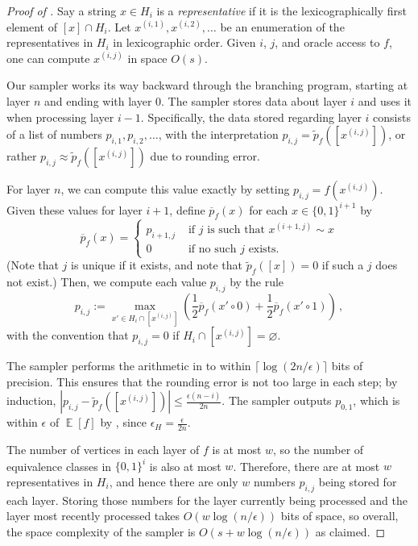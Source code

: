 \documentclass{toc}
\DeclareMathOperator*{\ExpVal}{\mathbb{E}}
\begin{document}
\begin{proof}[Proof of ]
Say a string $x \in H_i$ is a \emph{representative} if it is the lexicographically first element of $[x] \cap H_i$. Let $x^{(i, 1)}, x^{(i, 2)}, \dots$ be an enumeration of the representatives in $H_i$ in lexicographic order. Given $i$, $j$, and oracle access to $f$, one can compute $x^{(i, j)}$ in space $O(s)$.

Our sampler works its way backward through the branching program, starting at layer $n$ and ending with layer $0$. The sampler stores data about layer $i$ and uses it when processing layer $i - 1$. Specifically, the data stored regarding layer $i$ consists of a list of numbers $p_{i, 1}, p_{i, 2}, \dots$, with the interpretation $p_{i, j} = \widetilde{p}_f([x^{(i, j)}])$, or rather $p_{i, j} \approx \widetilde{p}_f([x^{(i, j)}])$ due to rounding error.

For layer $n$, we can compute this value exactly by setting $p_{i, j} = f(x^{(i, j)})$. 
Given these values for layer $i + 1$, define $\overline{p}_f(x)$ for each $x \in \{0, 1\}^{i + 1}$ by
\[
\overline{p}_f(x) = \begin{cases}
p_{i + 1, j} & \text{ if $j$ is such that $x^{(i + 1, j)} \sim x$} \\
0 & \text{ if no such $j$ exists.}
\end{cases}
\]
(Note that $j$ is unique if it exists, and note that $\widetilde{p}_f([x]) = 0$ if such a $j$ does not exist.) Then, we compute each value $p_{i, j}$ by the rule
\begin{equation} \label{eqn:pij}
p_{i, j} := \max_{x' \in H_i \cap [x^{(i, j)}]} \left(\frac{1}{2} \overline{p}_f(x' \circ 0) + \frac{1}{2} \overline{p}_f(x' \circ 1)\right)\,,
\end{equation}
with the convention that $p_{i, j} = 0$ if $H_i \cap [x^{(i, j)}] = \varnothing$.

The sampler performs the arithmetic in  to within $\lceil \log(2n/\epsilon)\rceil$ bits of precision. This ensures that the rounding error is not too large in each step; by induction, $|p_{i, j} - \widetilde{p}_f([x^{(i, j)}])| \leq \frac{\epsilon (n - i)}{2n}$. The sampler outputs $p_{0, 1}$, which is within $\epsilon$ of $\ExpVal[f]$ by , since $\epsilon_H = \frac{\epsilon}{2n}$.

The number of vertices in each layer of $f$ is at most $w$, so the number of equivalence classes in $\{0, 1\}^i$ is also at most $w$. Therefore, there are at most $w$ representatives in $H_i$, and hence there are only $w$ numbers $p_{i, j}$ being stored for each layer. Storing those numbers for the layer currently being processed and the layer most recently processed takes $O(w \log(n/\epsilon))$ bits of space, so overall, the space complexity of the sampler is $O(s + w \log(n/\epsilon))$ as claimed.
\end{proof}
\end{document}
